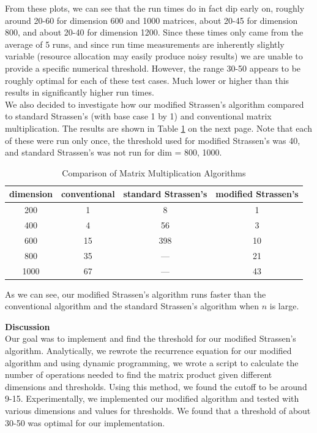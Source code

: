\documentclass[12pt]{article}
\begin{document}
From these plots, we can see that the run times do in fact dip early on, roughly around 20-60 for dimension 600 and 1000 matrices, about 20-45 for dimension 800, and about 20-40 for dimension 1200. Since these times only came from the average of 5 runs, and since run time measurements are inherently slightly variable (resource allocation may easily produce noisy results) we are unable to provide a specific numerical threshold. However, the range 30-50 appears to be roughly optimal for each of these test cases. Much lower or higher than this results in significantly higher run times. \\

We also decided to investigate how our modified Strassen's algorithm compared to standard Strassen's (with base case 1 by 1) and conventional matrix multiplication. The results are shown in Table \ref{table:comp} on the next page. Note that each of these were run only once, the threshold used for modified Strassen's was 40, and standard Strassen's was not run for dim = 800, 1000. \\

\begin{table}
\centering
{\setlength{\tabcolsep}{10pt}
\begin{tabular}{c|c|c|c}
dimension & conventional & standard Strassen's & modified Strassen's \\\hline
200 & \cellcolor{green}1 & 8 & \cellcolor{green}1 \\
400 & 4 & 56 & \cellcolor{green}3 \\
600 & 15 & 398 & \cellcolor{green}10 \\
800 & 35 & --- & \cellcolor{green}21 \\
1000 & 67 & --- & \cellcolor{green}43 \\
\end{tabular}}
\caption{Comparison of Matrix Multiplication Algorithms}
\label{table:comp}
\end{table}

As we can see, our modified Strassen's algorithm runs faster than the conventional algorithm and the standard Strassen's algorithm when $n$ is large. \\

\bigskip

\pagebreak

\textbf{Discussion} \\
Our goal was to implement and find the threshold for our modified Strassen's algorithm. Analytically, we rewrote the recurrence equation for our modified algorithm and using dynamic programming, we wrote a script to calculate the number of operations needed to find the matrix product given different dimensions and thresholds. Using this method, we found the cutoff to be around 9-15. Experimentally, we implemented our modified algorithm and tested with various dimensions and values for thresholds. We found that a threshold of about 30-50 was optimal for our implementation. \\
\end{document}
